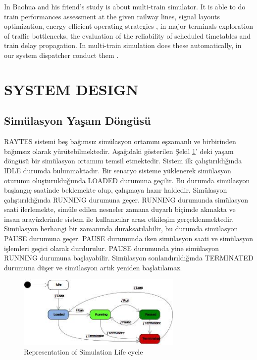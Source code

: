 \documentclass[conference]{IEEEtran}
\begin{document}
 


In Baohua  and his friend's study is about  multi-train simulator. It is able to do  train performances assessment at the given railway lines, signal layouts optimization, energy-efficient operating strategies , in major terminals exploration of traffic bottlenecks, the evaluation of the reliability of scheduled timetables and train delay propagation. In multi-train simulation does these automatically, in our system dispatcher conduct them \cite{ICVES}.




\section{SYSTEM DESIGN}
\subsection{Simülasyon Yaşam Döngüsü}

RAYTES sistemi beş bağımsız simülasyon ortamını eşzamanlı ve birbirinden bağımsız olarak yürütebilmektedir. Aşağıdaki gösterilen Şekil \ref{fig:simyasamdongusu}' deki yaşam döngüsü bir simülasyon ortamını temsil etmektedir. Sistem ilk çalıştırıldığında IDLE durumda bulunmaktadır. Bir senaryo sisteme yüklenerek simülasyon oturumu oluşturulduğunda LOADED durumuna geçilir. Bu durumda simülasyon başlangıç saatinde beklemekte olup, çalışmaya hazır haldedir. Simülasyon çalıştırıldığında RUNNING durumuna geçer. RUNNING durumunda simülasyon saati ilerlemekte, simüle edilen nesneler zamana duyarlı biçimde akmakta ve insan arayüzlerinde sistem ile kullanıcılar arası etkileşim gerçeklenmektedir. Simülasyon herhangi bir zamanında duraksatılabilir, bu durumda simülasyon PAUSE durumuna geçer. PAUSE durumunda iken simülasyon saati ve simülasyon işlemleri geçici olarak durdurulur. PAUSE durumunda yine simülasyon RUNNING durumuna başlayabilir. Simülasyon sonlandırıldığında TERMINATED durumuna düşer ve simülasyon artık yeniden başlatılamaz.




\begin{figure}[h!]
  \centering
  \includegraphics[width=8cm]{simyasamdongusu.jpg}
  \caption{Representation of Simulation Life cycle}\label{fig:simyasamdongusu}
\end{figure}
\end{document}
